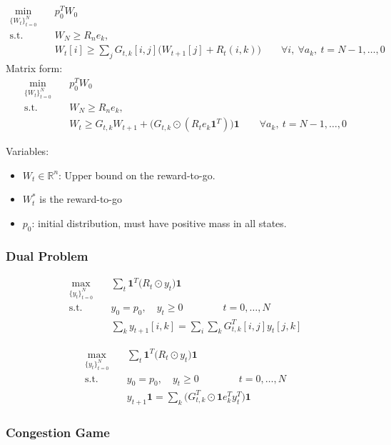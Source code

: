 \documentclass[]{article}
\newcommand{\mbf}{\mathbf}
\newcommand{\mb}{\mathbb}
\begin{document}
\begin{align}
\min_{\{W_t\}_{t=0}^N} & \quad p_0^TW_0 \\
\text{s.t.} & \quad W_N \geq R_n e_k, \\
& \quad W_t[i] \geq \sum_j G_{t,k}[i,j] \Big(W_{t+1}[j] + R_t(i,k)\Big) \qquad \forall i, \ \forall a_k, \ t=N-1,\dots,0
\end{align}
Matrix form:
\begin{align}
\min_{\{W_t\}_{t=0}^N} & \quad p_0^TW_0 \\
\text{s.t.} & \quad W_N \geq R_n e_k, \\
& \quad W_t \geq G_{t,k}W_{t+1} + \Big(G_{t,k} \odot (R_t e_k \mbf{1}^T) \Big) \mbf{1} \qquad  \forall a_k, \ t=N-1,\dots,0
\end{align}

Variables:
\begin{itemize}
\item $W_t \in \mb{R}^n$: Upper bound on the reward-to-go.
\item $W_t^*$ is the reward-to-go
\item $p_0$: initial distribution, must have positive mass in all states.
\end{itemize}

\subsubsection*{Dual Problem}



\begin{align}
\max_{\{y_t\}_{t=0}^N} & \quad \sum_t \mbf{1}^T\big( R_t \odot y_t\big) \mbf{1} \\
\text{s.t.} & \quad y_0 = p_0, \quad y_t \geq 0  \qquad \qquad t=0,\dots, N \\
& \quad \sum_k y_{t+1}[i,k] = \sum_i \sum_k G_{t,k}^T[i,j] y_t[j,k]
\end{align}

\begin{align}
\max_{\{y_t\}_{t=0}^N} & \quad \sum_t \mbf{1}^T\big( R_t \odot y_t\big) \mbf{1} \\
\text{s.t.} & \quad y_0 = p_0, \quad y_t \geq 0  \qquad \qquad t=0,\dots, N \\
& \quad y_{t+1}\mbf{1} = \sum_k \Big(G_{t,k}^T \odot \mbf{1}e_k^T y_t^T\Big)\mbf{1}
\end{align}

\subsubsection*{Congestion Game}
\end{document}
